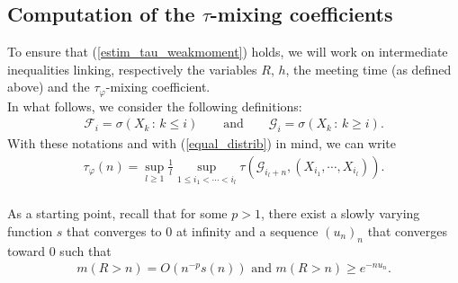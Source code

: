 \documentclass{ws-sd}
\newcommand{\calF}{\mathcal{F}}
\begin{document}
 \subsection{Computation of the \texorpdfstring{$\tau$}{t}-mixing coefficients}

    To ensure that (\ref{estim_tau_weakmoment}) holds, we will work on intermediate inequalities linking, respectively the variables $R$, $h$, the meeting time (as defined above) and the $\tau_\varphi$-mixing coefficient.
    \\
In what follows, we consider the following definitions:
\begin{align}
        \label{def_tribuFG}
    \calF_i = \sigma( X_k \, : \, k \le i)
    \qquad \text{and} \qquad
    \mathcal G_i = \sigma(X_k \, : \, k \ge i).
\end{align}
With these notations and with (\ref{equal_distrib}) in mind, we can write
\begin{align*}
    \tau_\varphi(n) = \underset{l \ge 1}{\sup} \frac{1}{l} \underset{1 \le i_1 < \cdots < i_l}{\sup} \tau(\mathcal G _{i_l + n}, (X_{i_1}, \cdots, X_{i_l})).
\end{align*}
    \\

    \noindent
    As a starting point, recall that for some $p >1$, there exist a slowly varying function $s$ that converges to 0 at infinity and a sequence $(u_n)_n$ that converges toward 0 such that
    \begin{align} \label{queue_m}
        m(R > n) = O(n^{-p} s(n)) \text{ and } m(R > n)  \ge e^{-nu_n}.
    \end{align}
\end{document}
